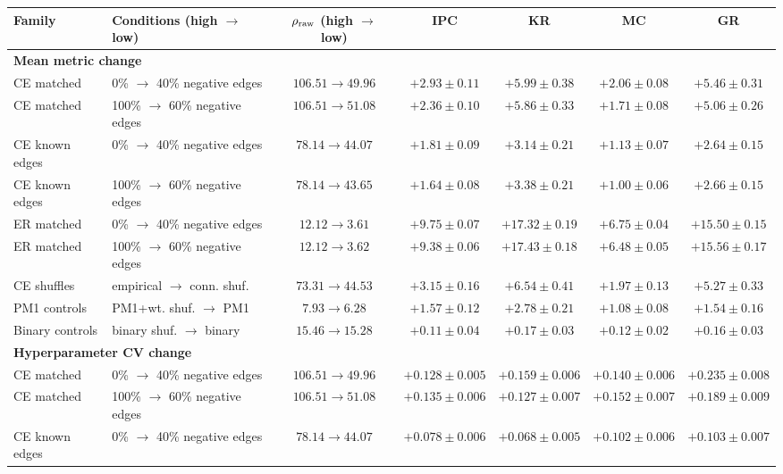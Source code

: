 \begin{table}[tbp]
\centering\scriptsize
\setlength{\tabcolsep}{2pt}
\begin{tabular}{llccccc}
\hline
Family & Conditions (high $\to$ low) & $\rho_{\rm raw}$ (high $\to$ low) & IPC & KR & MC & GR \\
\hline
\multicolumn{7}{l}{\textbf{Mean metric change}} \\
CE matched & 0\% $\to$ 40\% negative edges & $106.51\to49.96$ & $+2.93\pm0.11$ & $+5.99\pm0.38$ & $+2.06\pm0.08$ & $+5.46\pm0.31$ \\
CE matched & 100\% $\to$ 60\% negative edges & $106.51\to51.08$ & $+2.36\pm0.10$ & $+5.86\pm0.33$ & $+1.71\pm0.08$ & $+5.06\pm0.26$ \\
CE known edges & 0\% $\to$ 40\% negative edges & $78.14\to44.07$ & $+1.81\pm0.09$ & $+3.14\pm0.21$ & $+1.13\pm0.07$ & $+2.64\pm0.15$ \\
CE known edges & 100\% $\to$ 60\% negative edges & $78.14\to43.65$ & $+1.64\pm0.08$ & $+3.38\pm0.21$ & $+1.00\pm0.06$ & $+2.66\pm0.15$ \\
ER matched & 0\% $\to$ 40\% negative edges & $12.12\to3.61$ & $+9.75\pm0.07$ & $+17.32\pm0.19$ & $+6.75\pm0.04$ & $+15.50\pm0.15$ \\
ER matched & 100\% $\to$ 60\% negative edges & $12.12\to3.62$ & $+9.38\pm0.06$ & $+17.43\pm0.18$ & $+6.48\pm0.05$ & $+15.56\pm0.17$ \\
CE shuffles & empirical $\to$ conn. shuf. & $73.31\to44.53$ & $+3.15\pm0.16$ & $+6.54\pm0.41$ & $+1.97\pm0.13$ & $+5.27\pm0.33$ \\
PM1 controls & PM1+wt. shuf. $\to$ PM1 & $7.93\to6.28$ & $+1.57\pm0.12$ & $+2.78\pm0.21$ & $+1.08\pm0.08$ & $+1.54\pm0.16$ \\
Binary controls & binary shuf. $\to$ binary & $15.46\to15.28$ & $+0.11\pm0.04$ & $+0.17\pm0.03$ & $+0.12\pm0.02$ & $+0.16\pm0.03$ \\
\hline
\multicolumn{7}{l}{\textbf{Hyperparameter CV change}} \\
CE matched & 0\% $\to$ 40\% negative edges & $106.51\to49.96$ & $+0.128\pm0.005$ & $+0.159\pm0.006$ & $+0.140\pm0.006$ & $+0.235\pm0.008$ \\
CE matched & 100\% $\to$ 60\% negative edges & $106.51\to51.08$ & $+0.135\pm0.006$ & $+0.127\pm0.007$ & $+0.152\pm0.007$ & $+0.189\pm0.009$ \\
CE known edges & 0\% $\to$ 40\% negative edges & $78.14\to44.07$ & $+0.078\pm0.006$ & $+0.068\pm0.005$ & $+0.102\pm0.006$ & $+0.103\pm0.007$ \\

\end{tabular}
\end{table}
